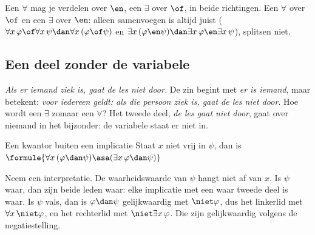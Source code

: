 
\begin{werkwijze}
Een $\forall$ mag je verdelen over $\en$, een $\exists$ over $\of$, in beide richtingen. Een $\forall$ over $\of$ en een $\exists$ over $\en$: alleen samenvoegen is altijd juist ($\forall x\, \varphi \of \forall x\, \psi \dan \forall x\, (\varphi \of \psi)$ en $\exists x\, (\varphi \en \psi) \dan \exists x\, \varphi \en \exists x\, \psi$), splitsen niet.
\end{werkwijze}

\begin{oefeningen}
\end{oefeningen}

\subsection{Een deel zonder de variabele}

\textit{Als er iemand ziek is, gaat de les niet door.} De zin begint met \textit{er is iemand}, maar betekent: \textit{voor iedereen geldt: als die persoon ziek is, gaat de les niet door}. Hoe wordt een $\exists$ zomaar een $\forall$? Het tweede deel, \textit{de les gaat niet door}, gaat over niemand in het bijzonder: de variabele staat er niet in.

\begin{theorie}
\begin{stelling}{Een kwantor buiten een implicatie}
Staat $x$ niet vrij in $\psi$, dan is
\qquad $\formule{\forall x\, (\varphi \dan \psi) \asa (\exists x\, \varphi \dan \psi)}$
\end{stelling}

\begin{bewijs}
Neem een interpretatie. De waarheidswaarde van $\psi$ hangt niet af van $x$. Is $\psi$ waar, dan zijn beide leden waar: elke implicatie met een waar tweede deel is waar. Is $\psi$ vals, dan is $\varphi \dan \psi$ gelijkwaardig met $\niet\varphi$, dus het linkerlid met $\forall x\, \niet\varphi$, en het rechterlid met $\niet\exists x\, \varphi$. Die zijn gelijkwaardig volgens de negatiestelling.
\end{bewijs}
\end{theorie}

